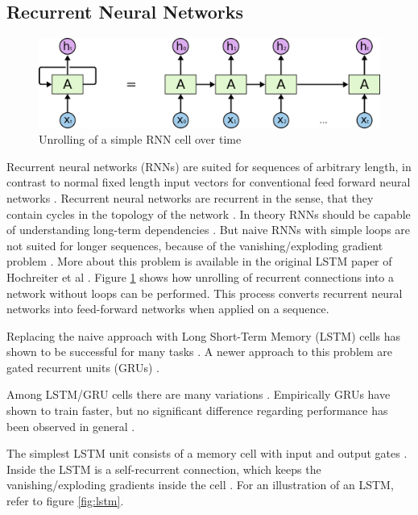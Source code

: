 \documentclass[draft,final,oneside]{vutinfth} %
\begin{document}
\subsection{Recurrent Neural Networks} \label{lstmbackground}

\begin{figure}[ht]
	\centering
  	\includegraphics[width=1.0\textwidth]{graphics/rnn.png}
	\caption{Unrolling of a simple RNN cell over time \cite{colahlstm}}
	\label{fig:rnn}
\end{figure}

Recurrent neural networks (RNNs) are suited for sequences of arbitrary length, in contrast to normal fixed length input vectors for conventional feed forward neural networks \cite{hochreiter}. Recurrent neural networks are recurrent in the sense, that they contain cycles in the topology of the network  \cite{deeplearninginneuralnetworks}. In theory RNNs should be capable of understanding long-term dependencies \cite{hochreiter}. But naive RNNs with simple loops are not suited for longer sequences, because of the vanishing/exploding gradient problem \cite{hochreiter}. More about this problem is available in the original LSTM paper of Hochreiter et al \cite{hochreiter}. Figure \ref{fig:rnn} shows how unrolling of recurrent connections into a network without loops can be performed. This process converts  recurrent neural networks into feed-forward networks when applied on a sequence.

Replacing the naive approach with Long Short-Term Memory (LSTM) cells has shown to be successful for many tasks \cite{nmt}\cite{hochreiter}\cite{deeplearninginneuralnetworks}. A newer approach to this problem are gated recurrent units (GRUs) \cite{gru}.

Among LSTM/GRU cells there are many variations \cite{Goodfellow-et-al-2016}. Empirically GRUs have shown to train faster, but no significant difference regarding performance has been observed in general \cite{gru}.

The simplest LSTM unit consists of a memory cell with input and output gates \cite{hochreiter}. Inside the LSTM is a self-recurrent connection, which keeps the vanishing/exploding gradients inside the cell \cite{hochreiter}. For an illustration of an LSTM, refer to figure \ref{fig:lstm}.
\end{document}
